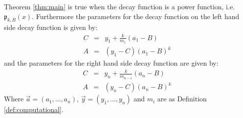 \documentclass[10pt]{article}
\begin{document}
\begin{theorem}
\label{thm:power}
Theorem \ref{thm:main} is true when the decay function is a power function, i.e.
$\mathfrak{p}_{k,B}(x)$.  Furthermore the parameters for the decay function on the left hand
side decay function is given by:
\begin{eqnarray*}
C&=&y_1 + \frac{k}{m_1}(a_1-B)\\
A&=&(y_1-C)(a_1-B)^k
\end{eqnarray*}
and the parameters for the right hand side decay function are given by:
\begin{eqnarray*}
C&=&y_n + \frac{k}{m_{n-1}}(a_n-B)\\
A&=&(y_n-C)(a_n-B)^k
\end{eqnarray*}
Where $\vec{a}=(a_1, \ldots, a_n)$, $\vec{y}=(y_1,\ldots,y_n)$ and $m_i$ are
as Definition \ref{def:computational}.
\end{theorem}
\end{document}

